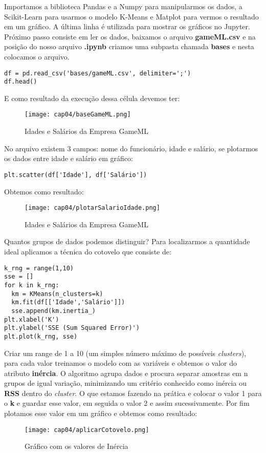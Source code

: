 Importamos a biblioteca Pandas e a Numpy para manipularmos os dados, a Scikit-Learn para usarmos o modelo K-Means e Matplot para vermos o resultado em um gráfico. A última linha é utilizada para mostrar os gráficos no Jupyter. Próximo passo consiste em ler os dados, baixamos o arquivo \textbf{gameML.csv} e na posição do nosso arquivo \textbf{.ipynb} criamos uma subpasta chamada \textbf{bases} e nesta colocamos o arquivo.
\begin{lstlisting}[]
df = pd.read_csv('bases/gameML.csv', delimiter=';')
df.head()
\end{lstlisting}

E como resultado da execução dessa célula devemos ter:
\begin{figure}[H]
	\centering
	\texttt{[image: cap04/baseGameML.png]}
	\caption{Idades e Salários da Empresa GameML}
\end{figure}

No arquivo existem 3 campos: nome do funcionário, idade e salário, se plotarmos os dados entre idade e salário em gráfico:
\begin{lstlisting}[]
plt.scatter(df['Idade'], df['Salário'])
\end{lstlisting}

Obtemos como resultado:
\begin{figure}[H]
	\centering
	\texttt{[image: cap04/plotarSalarioIdade.png]}
	\caption{Idades e Salários da Empresa GameML}
\end{figure}

Quantos grupos de dados podemos distinguir? Para localizarmos a quantidade ideal aplicamos a técnica do cotovelo que consiste de:
\begin{lstlisting}[]
k_rng = range(1,10)
sse = []
for k in k_rng:
  km = KMeans(n_clusters=k)
  km.fit(df[['Idade','Salário']])
  sse.append(km.inertia_)
plt.xlabel('K')
plt.ylabel('SSE (Sum Squared Error)')
plt.plot(k_rng, sse)
\end{lstlisting}

Criar um range de 1 a 10 (um simples número máximo de possíveis \textit{clusters}), para cada valor treinamos o modelo com as variáveis e obtemos o valor do atributo \textbf{inércia}. O algoritmo agrupa dados e procura separar amostras em n grupos de igual variação, minimizando um critério conhecido como inércia ou \textbf{RSS} dentro do \textit{cluster}. O que estamos fazendo na prática e colocar o valor 1 para o \textbf{k} e guardar esse valor, em seguida o valor 2 e assim sucessivamente. Por fim plotamos esse valor em um gráfico e obtemos como resultado:
\begin{figure}[H]
	\centering
	\texttt{[image: cap04/aplicarCotovelo.png]}
	\caption{Gráfico com os valores de Inércia}
\end{figure}

